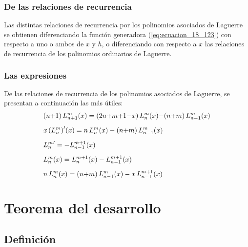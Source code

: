 \documentclass[12pt]{beamer}
\begin{document}
\begin{frame}
\frametitle{De las relaciones de recurrencia}
Las distintas relaciones de recurrencia por los polinomios asociados de Laguerre se obtienen diferenciando la función generadora (\ref{eq:ecuacion_18_123}) con respecto a uno o ambos de $x$ y $h$, \pause o diferenciando con respecto a $x$ las relaciones de recurrencia de los polinomios ordinarios de Laguerre.
\end{frame}
\begin{frame}
\frametitle{Las expresiones}
De las relaciones de recurrencia de los polinomios asociados de Laguerre, se presentan a continuación las más útiles:
\pause
\begin{eqnarray*}
\begin{aligned}
&(n {+} 1) \, L_{n+1}^{m} (x) = (2 n {+} m {+} 1 {-} x) \, L_{n}^{m} (x) {-} (n {+} m) \, L_{n-1}^{m} (x) \\[0.5em]
&x \, {(L_{n}^{m})}^{\prime} (x) = n \, L_{n}^{m} (x) - (n {+} m) \, L_{n-1}^{m} (x) \\[0.5em]
&{L_{n}^{m}}^{\prime} = - L_{n-1}^{m+1} (x)  \\[0.5em]
&L_{n}^{m} (x) = L_{n}^{m+1} (x) - L_{n-1}^{m+1} (x)  \\[0.5em]
&n \, L_{n}^{m} (x) = (n {+} m) \, L_{n-1}^{m} (x) - x \, L_{n-1}^{m+1} (x) 
\end{aligned}
\end{eqnarray*}
\end{frame}

\section{Teorema del desarrollo}
\subsection{Definición}
\end{document}
